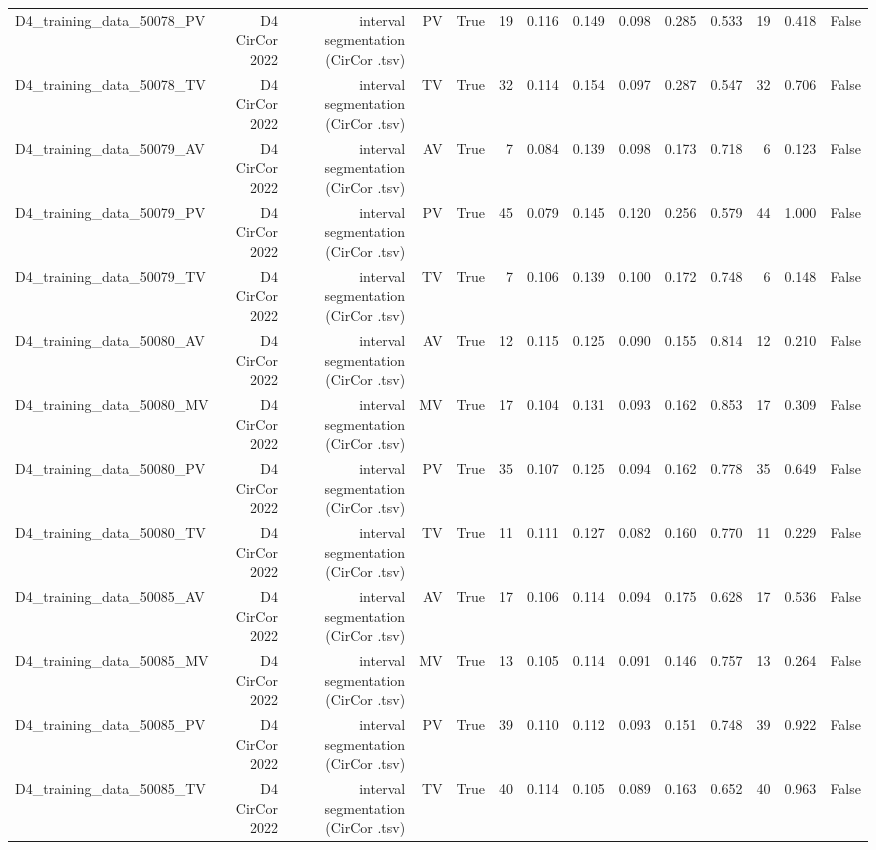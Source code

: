 \begin{table}[htbp]
\begin{tabular}{lrrrrrrrrrrrrr}
    D4\_training\_data\_50078\_PV & D4 CirCor 2022 & interval segmentation (CirCor .tsv) & PV & True & 19 & 0.116 & 0.149 & 0.098 & 0.285 & 0.533 & 19 & 0.418 & False \\
    D4\_training\_data\_50078\_TV & D4 CirCor 2022 & interval segmentation (CirCor .tsv) & TV & True & 32 & 0.114 & 0.154 & 0.097 & 0.287 & 0.547 & 32 & 0.706 & False \\
    D4\_training\_data\_50079\_AV & D4 CirCor 2022 & interval segmentation (CirCor .tsv) & AV & True & 7 & 0.084 & 0.139 & 0.098 & 0.173 & 0.718 & 6 & 0.123 & False \\
    D4\_training\_data\_50079\_PV & D4 CirCor 2022 & interval segmentation (CirCor .tsv) & PV & True & 45 & 0.079 & 0.145 & 0.120 & 0.256 & 0.579 & 44 & 1.000 & False \\
    D4\_training\_data\_50079\_TV & D4 CirCor 2022 & interval segmentation (CirCor .tsv) & TV & True & 7 & 0.106 & 0.139 & 0.100 & 0.172 & 0.748 & 6 & 0.148 & False \\
    D4\_training\_data\_50080\_AV & D4 CirCor 2022 & interval segmentation (CirCor .tsv) & AV & True & 12 & 0.115 & 0.125 & 0.090 & 0.155 & 0.814 & 12 & 0.210 & False \\
    D4\_training\_data\_50080\_MV & D4 CirCor 2022 & interval segmentation (CirCor .tsv) & MV & True & 17 & 0.104 & 0.131 & 0.093 & 0.162 & 0.853 & 17 & 0.309 & False \\
    D4\_training\_data\_50080\_PV & D4 CirCor 2022 & interval segmentation (CirCor .tsv) & PV & True & 35 & 0.107 & 0.125 & 0.094 & 0.162 & 0.778 & 35 & 0.649 & False \\
    D4\_training\_data\_50080\_TV & D4 CirCor 2022 & interval segmentation (CirCor .tsv) & TV & True & 11 & 0.111 & 0.127 & 0.082 & 0.160 & 0.770 & 11 & 0.229 & False \\
    D4\_training\_data\_50085\_AV & D4 CirCor 2022 & interval segmentation (CirCor .tsv) & AV & True & 17 & 0.106 & 0.114 & 0.094 & 0.175 & 0.628 & 17 & 0.536 & False \\
    D4\_training\_data\_50085\_MV & D4 CirCor 2022 & interval segmentation (CirCor .tsv) & MV & True & 13 & 0.105 & 0.114 & 0.091 & 0.146 & 0.757 & 13 & 0.264 & False \\
    D4\_training\_data\_50085\_PV & D4 CirCor 2022 & interval segmentation (CirCor .tsv) & PV & True & 39 & 0.110 & 0.112 & 0.093 & 0.151 & 0.748 & 39 & 0.922 & False \\
    D4\_training\_data\_50085\_TV & D4 CirCor 2022 & interval segmentation (CirCor .tsv) & TV & True & 40 & 0.114 & 0.105 & 0.089 & 0.163 & 0.652 & 40 & 0.963 & False \\

\end{tabular}
\end{table}
